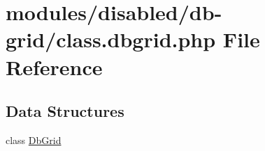 \hypertarget{class_8dbgrid_8php}{\section{modules/disabled/db-\/grid/class.dbgrid.\-php File Reference}
\label{class_8dbgrid_8php}
}
\subsection*{Data Structures}
\begin{DoxyCompactItemize}
\item 
class \hyperlink{class_db_grid}{Db\-Grid}
\end{DoxyCompactItemize}
